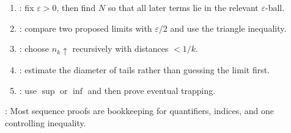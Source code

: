\begin{method} \label{meth:sequence-proof-patterns}\label{meth:sequence-proof-patterns-source-todo} 
\begin{enumerate}[label=(\roman*)]
\setlength{\itemsep}{0pt}
\item {}: fix $\varepsilon>0$, then find $N$ so that all later terms lie in the relevant $\varepsilon$-ball.
\item {}: compare two proposed limits with $\varepsilon/2$ and use the triangle inequality.
\item {}: choose $n_k\uparrow$ recursively with distances $<1/k$.
\item {}: estimate the diameter of tails rather than guessing the limit first.
\item {}: use $\sup$ or $\inf$ and then prove eventual trapping.
\end{enumerate}
: Most sequence proofs are bookkeeping for quantifiers, indices, and one controlling inequality.
\end{method}
